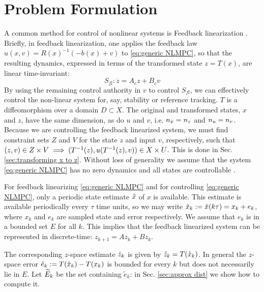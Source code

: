 \section{Problem Formulation} 
\label{sec:formulation}
A common method for control of nonlinear systems is Feedback linearization \cite{khalil}. 
Briefly, in feedback linearization, one applies the feedback law $u(x,v) = R(x)^{-1}(-b(x)+v)$ to \eqref{eq:generic NLMPC}, so that the resulting dynamics, expressed in terms of the transformed state $z = T(x)$, are linear time-invariant:
\begin{equation}
\label{eq:LTI_fb_lin}
S_{fl}: \dot{z} = A_cz + B_cv
\end{equation}
By using the remaining control authority in $v$ to control $S_{fl}$, we can effectively control the non-linear system for, say, stability or reference tracking.
$T$ is a diffeomorphism over a domain $D \subset X$.
The original and transformed states, $x$ and $z$, have the same dimension, as do $u$ and $v$, i.e. $n_x = n_z$ and $n_u = n_v$.
Because we are controlling the feedback linearized system, we must find constraint sets $Z$ and $V$ for the state $z$ and input $v$, respectively, such that $(z,v) \in Z\times V \implies (T^{-1}(z), u(T^{-1}(z), v)) \in X \times U$.
This is done in Sec. \ref{sec:transforming x to z}.
Without loss of generality we assume that the system \eqref{eq:generic NLMPC} has no zero dynamics and all states are controllable \cite{khalil}. 

For feedback linearizing \eqref{eq:generic NLMPC} and for controlling \eqref{eq:generic NLMPC}, only a periodic state estimate $\hat{x}$ of $x$ is available.
This estimate is available periodically every $\tau$ time units, so we may write $\hat{x}_{k} := \hat{x}(k\tau) = x_k + e_k$, where $x_k$ and $e_k$ are sampled state and error respectively.
We assume that $e_k$ is in a bounded set $E$ for all $k$.
This implies that the feedback linearized system can be represented in discrete-time: $z_{k+1} = Az_k + B z_k$.

The corresponding $z$-space estimate $\hat{z}_{k}$ is given by $\hat{z}_{k} = T(\hat{x}_{k})$.
In general the $z$-space error $\tilde{e}_k := T(\hat{x}_k) - T(x_k)$ is bounded for every $k$ but does not necessarily lie in $E$.
Let $\widetilde{E}_{k}$ be the set containing $\tilde{e}_k$: in Sec. \ref{sec:approx dist} we show how to compute it.


